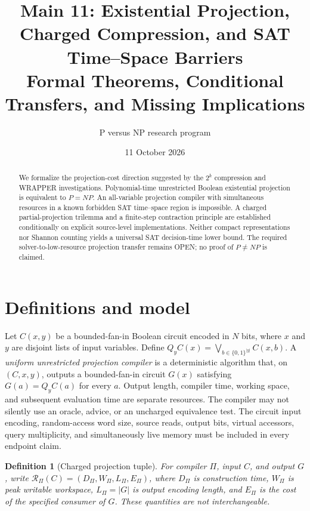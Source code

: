 \documentclass[11pt]{article}
\title{Main 11: Existential Projection, Charged Compression, and SAT Time--Space Barriers\\
\large Formal Theorems, Conditional Transfers, and Missing Implications}
\author{P versus NP research program}
\date{11 October 2026}
\newtheorem{definition}[theorem]{Definition}
\begin{document}
\maketitle
\begin{abstract}
We formalize the projection-cost direction suggested by the $2^k$ compression and
WRAPPER investigations. Polynomial-time unrestricted Boolean existential
projection is equivalent to $P=NP$. An all-variable projection compiler with
simultaneous resources in a known forbidden SAT time--space region is impossible.
A charged partial-projection trilemma and a finite-step contraction principle
are established conditionally on explicit source-level implementations.
Neither compact representations nor Shannon counting yields a universal
SAT decision-time lower bound. The required solver-to-low-resource projection
transfer remains OPEN; no proof of $P\ne NP$ is claimed.
\end{abstract}

\section{Definitions and model}
Let $C(x,y)$ be a bounded-fan-in Boolean circuit encoded in $N$ bits,
where $x$ and $y$ are disjoint lists of input variables. Define
$Q_y C(x)=\bigvee_{b\in\{0,1\}^{|y|}}C(x,b)$.
A \emph{uniform unrestricted projection compiler} is a deterministic
algorithm that, on $(C,x,y)$, outputs a bounded-fan-in circuit $G(x)$
satisfying $G(a)=Q_yC(a)$ for every $a$. Output length, compiler time,
working space, and subsequent evaluation time are separate resources.
The compiler may not silently use an oracle, advice, or an uncharged
equivalence test. The circuit input encoding, random-access word size,
source reads, output bits, virtual accessors, query multiplicity, and
simultaneously live memory must be included in every endpoint claim.

\begin{definition}[Charged projection tuple]
For compiler $\Pi$, input $C$, and output $G$, write
$\mathcal R_\Pi(C)=(D_\Pi,W_\Pi,L_\Pi,E_\Pi)$, where $D_\Pi$ is
construction time, $W_\Pi$ is peak writable workspace, $L_\Pi=|G|$
is output encoding length, and $E_\Pi$ is the cost of the specified
consumer of $G$. These quantities are not interchangeable.
\end{definition}
\end{document}
